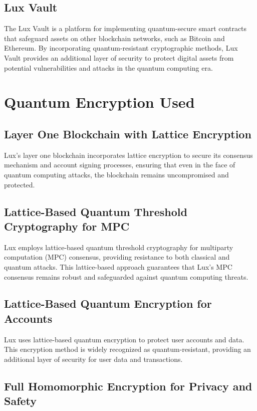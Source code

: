 \documentclass[11pt]{article}
\begin{document}
\subsection{Lux Vault}

The Lux Vault is a platform for implementing quantum-secure smart contracts that safeguard assets on other blockchain networks, such as Bitcoin and Ethereum. By incorporating quantum-resistant cryptographic methods, Lux Vault provides an additional layer of security to protect digital assets from potential vulnerabilities and attacks in the quantum computing era.


\section{Quantum Encryption Used}

\subsection{Layer One Blockchain with Lattice Encryption}

Lux's layer one blockchain incorporates lattice encryption to secure its consensus mechanism and account signing processes, ensuring that even in the face of quantum computing attacks, the blockchain remains uncompromised and protected.


\subsection{Lattice-Based Quantum Threshold Cryptography for MPC}

Lux employs lattice-based quantum threshold cryptography for multiparty computation (MPC) consensus, providing resistance to both classical and quantum attacks. This lattice-based approach guarantees that Lux's MPC consensus remains robust and safeguarded against quantum computing threats.


\subsection{Lattice-Based Quantum Encryption for Accounts}

Lux uses lattice-based quantum encryption to protect user accounts and data. This encryption method is widely recognized as quantum-resistant, providing an additional layer of security for user data and transactions.


\subsection{Full Homomorphic Encryption for Privacy and Safety}
\end{document}
